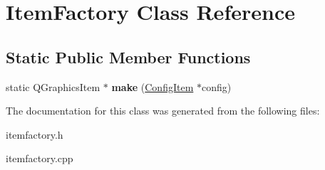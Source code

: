 \hypertarget{classItemFactory}{\section{Item\-Factory Class Reference}
\label{classItemFactory}
}
\subsection*{Static Public Member Functions}
\begin{DoxyCompactItemize}
\item 
\hypertarget{classItemFactory_a1efc7a13647cb8a221048900abcdc290}{static Q\-Graphics\-Item $\ast$ {\bfseries make} (\hyperlink{classConfigItem}{Config\-Item} $\ast$config)}\label{classItemFactory_a1efc7a13647cb8a221048900abcdc290}

\end{DoxyCompactItemize}


The documentation for this class was generated from the following files\-:\begin{DoxyCompactItemize}
\item 
itemfactory.\-h\item 
itemfactory.\-cpp\end{DoxyCompactItemize}

